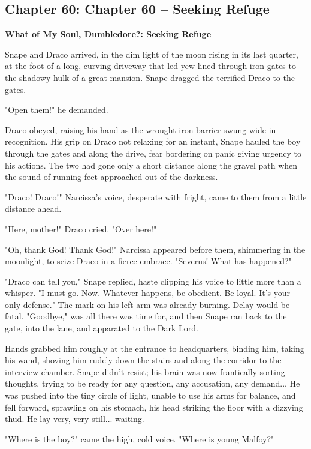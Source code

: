 \documentclass[a4paper,11pt]{article}
\begin{document}
\subsection{Chapter 60: Chapter 60 – Seeking Refuge}

\textbf{What of My Soul, Dumbledore?: Seeking Refuge}

Snape and Draco arrived, in the dim light of the moon rising in its last quarter, at the foot of a long, curving driveway that led yew-lined through iron gates to the shadowy hulk of a great mansion. Snape dragged the terrified Draco to the gates.

"Open them!" he demanded.

Draco obeyed, raising his hand as the wrought iron barrier swung wide in recognition. His grip on Draco not relaxing for an instant, Snape hauled the boy through the gates and along the drive, fear bordering on panic giving urgency to his actions. The two had gone only a short distance along the gravel path when the sound of running feet approached out of the darkness.

"Draco! Draco!" Narcissa's voice, desperate with fright, came to them from a little distance ahead.

"Here, mother!" Draco cried. "Over here!"

"Oh, thank God! Thank God!" Narcissa appeared before them, shimmering in the moonlight, to seize Draco in a fierce embrace. "Severus! What has happened?"

"Draco can tell you," Snape replied, haste clipping his voice to little more than a whisper. "I must go. Now. Whatever happens, be obedient. Be loyal. It's your only defense." The mark on his left arm was already burning. Delay would be fatal. "Goodbye," was all there was time for, and then Snape ran back to the gate, into the lane, and apparated to the Dark Lord.

Hands grabbed him roughly at the entrance to headquarters, binding him, taking his wand, shoving him rudely down the stairs and along the corridor to the interview chamber. Snape didn't resist; his brain was now frantically sorting thoughts, trying to be ready for any question, any accusation, any demand... He was pushed into the tiny circle of light, unable to use his arms for balance, and fell forward, sprawling on his stomach, his head striking the floor with a dizzying thud. He lay very, very still... waiting.

"Where is the boy?" came the high, cold voice. "Where is young Malfoy?"
\end{document}
